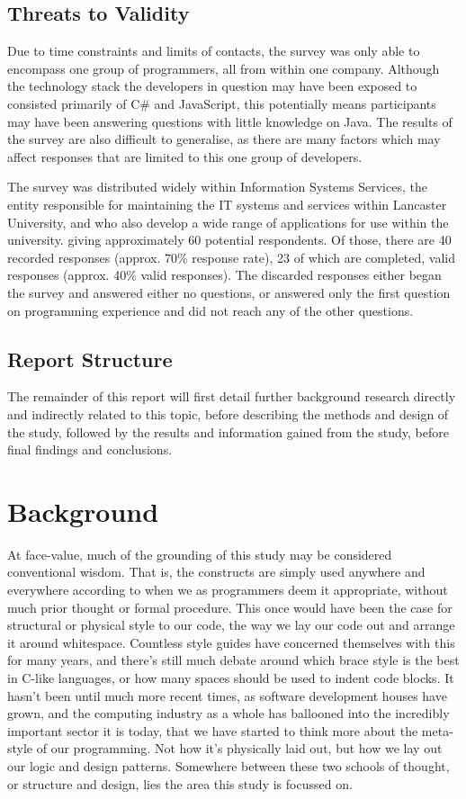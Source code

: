 \documentclass{article}
\begin{document}
    \subsection{Threats to Validity}
        Due to time constraints and limits of contacts, the survey was only able to encompass one group of programmers, all from within one company. Although the technology stack the developers in question may have been exposed to consisted primarily of C\# and JavaScript, this potentially means participants may have been answering questions with little knowledge on Java. The results of the survey are also difficult to generalise, as there are many factors which may affect responses that are limited to this one group of developers.

        The survey was distributed widely within Information Systems Services, the entity responsible for maintaining the IT systems and services within Lancaster University, and who also develop a wide range of applications for use within the university.  giving approximately 60 potential respondents. Of those, there are 40 recorded responses  (approx. 70\% response rate), 23 of which are completed, valid responses (approx. 40\% valid responses). The discarded responses either began the survey and answered either no questions, or answered only the first question on programming experience and did not reach any of the other questions.
        
    \subsection{Report Structure}
        The remainder of this report will first detail further background research directly and indirectly related to this topic, before describing the methods and design of the study, followed by the results and information gained from the study, before final findings and conclusions.
\newpage
\section{Background}
\label{sec:background}
    At face-value, much of the grounding of this study may be considered conventional wisdom. That is, the constructs are simply used anywhere and everywhere according to when we as programmers deem it appropriate, without much prior thought or formal procedure. This once would have been the case for structural or physical style to our code, the way we lay our code out and arrange it around whitespace. Countless style guides have concerned themselves with this for many years, and there's still much debate around which brace style is the best in C-like languages, or how many spaces should be used to indent code blocks. It hasn't been until much more recent times, as software development houses have grown, and the computing industry as a whole has ballooned into the incredibly important sector it is today, that we have started to think more about the meta-style of our programming. Not how it's physically laid out, but how we lay out our logic and design patterns. Somewhere between these two schools of thought, or structure and design, lies the area this study is focussed on.
\end{document}
